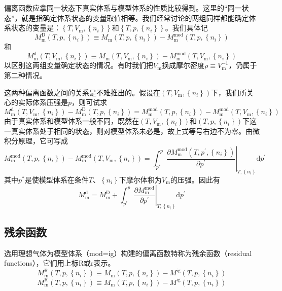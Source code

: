 \documentclass[main.tex]{subfiles}
\begin{document}
偏离函数应拿同一状态下真实体系与模型体系的性质比较得到。这里的“同一状态”，就是指确定体系状态的变量取值相等。我们经常讨论的两组同样都能确定体系状态的变量是：$\left\{T,V_\text{m},\left\{n_i\right\}\right\}$和$\left\{T,p,\left\{n_i\right\}\right\}$。我们具体记
\begin{equation}\label{eq:def_deviation_function_D}
    M^\text{D}_\text{m}\left(T,p,\left\{n_i\right\}\right)\equiv M_\text{m}\left(T,p,\left\{n_i\right\}\right)-M^\text{mod}_\text{m}\left(T,p,\left\{n_i\right\}\right)
\end{equation}
和
\begin{equation}\label{eq:def_deviation_function_d}
    M^\text{d}_\text{m}\left(T,V_\text{m},\left\{n_i\right\}\right)\equiv M_\text{m}\left(T,V_\text{m},\left\{n_i\right\}\right)-M^\text{mod}_\text{m}\left(T,V_\text{m},\left\{n_i\right\}\right)
\end{equation}
以区别这两组变量确定状态的情况。有时我们把$V_\text{m}$换成摩尔密度$\rho\equiv V^{-1}_\text{m}$，仍属于第二种情况。

这两种偏离函数之间的关系是不难推出的。假设在$\left(T,V_\text{m},\left\{n_i\right\}\right)$下，我们所关心的实际体系压强是$p$，则可试求
\[M^\text{d}_\text{m}\left(T,V_\text{m},\left\{n_i\right\}\right)-M^\text{D}_\text{m}\left(T,p,\left\{n_i\right\}\right)=M^\text{mod}_\text{m}\left(T,p,\left\{n_i\right\}\right)-M^\text{mod}_\text{m}\left(T,V_\text{m},\left\{n_i\right\}\right)\]
由于真实体系和模型体系一般不同，既然在$\left(T,V_\text{m},\left\{n_i\right\}\right)$和$\left(T,p,\left\{n_i\right\}\right)$下这一真实体系处于相同的状态，则对模型体系未必是，故上式等号右边不为零。由微积分原理，它可写成
\[M^\text{mod}_\text{m}\left(T,p,\left\{n_i\right\}\right)-M^\text{mod}_\text{m}\left(T,V_\text{m},\left\{n_i\right\}\right)=\int_{p^*}^p\left.\frac{\partial M^\text{mod}_\text{m}\left(T,p^\prime,\left\{n_i\right\}\right)}{\partial p^\prime}\right|_{T,\left\{n_i\right\}}\mathrm{d}p^\prime\]
其中$p^*$是使模型体系在条件$T$、$\left\{n_i\right\}$下摩尔体积为$V_\text{m}$的压强。因此有
\begin{equation}\label{eq:rel_MD_Md}
M^\text{d}_\text{m}=M^\text{D}_\text{m}+\int_{p^*}^p\left.\frac{\partial M^\text{mod}_\text{m}}{\partial p^\prime}\right|_{T,\left\{n_i\right\}}\mathrm{d}p^\prime
\end{equation}

\subsection{残余函数}
选用理想气体为模型体系（mod=ig）构建的偏离函数特称为残余函数（residual functions），它们用上标R或r表示。
\begin{equation}\label{eq:def_residual_function_R}
    M^\text{R}_\text{m}\left(T,p,\left\{n_i\right\}\right)\equiv M_\text{m}\left(T,p,\left\{n_i\right\}\right)-M^\text{ig}\left(T,p,\left\{n_i\right\}\right)
\end{equation}
\begin{equation}\label{eq:def_residual_function_r}
    M^\text{R}_\text{m}\left(T,p,\left\{n_i\right\}\right)\equiv M_\text{m}\left(T,p,\left\{n_i\right\}\right)-M^\text{ig}\left(T,p,\left\{n_i\right\}\right)
\end{equation}
\end{document}
